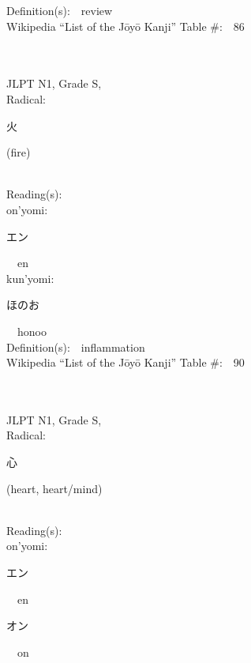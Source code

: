 \begin{multicols}{2}
Definition(s):\ \ review \\
Wikipedia ``List of the J\=oy\=o Kanji'' Table \#:\ \ 86 \\
\ \ \\
{\fontsize{34pt}{40pt}  }\ \ \\
{JLPT N1, Grade S, \\Radical:\ \ {\begin{CJK}{UTF8}{min} 火 \end{CJK}} (fire) } \\
Reading(s):\ \ \\
{\hspace*{1em}}on'yomi:\ \ \\
{\hspace*{2em}}{\begin{CJK}{UTF8}{min} エン \end{CJK}}\ \ en\ \ \\
{\hspace*{1em}}kun'yomi:\ \ \\
{\hspace*{2em}}{\begin{CJK}{UTF8}{min} ほのお \end{CJK}}\ \ honoo\ \ \\
Definition(s):\ \ inflammation \\
Wikipedia ``List of the J\=oy\=o Kanji'' Table \#:\ \ 90 \\
\ \ \\
{\fontsize{34pt}{40pt}  }\ \ \\
{JLPT N1, Grade S, \\Radical:\ \ {\begin{CJK}{UTF8}{min} 心 \end{CJK}} (heart, heart/mind) } \\
Reading(s):\ \ \\
{\hspace*{1em}}on'yomi:\ \ \\
{\hspace*{2em}}{\begin{CJK}{UTF8}{min} エン \end{CJK}}\ \ en\ \ \\
{\hspace*{2em}}{\begin{CJK}{UTF8}{min} オン \end{CJK}}\ \ on\ \ \\

\end{multicols}
